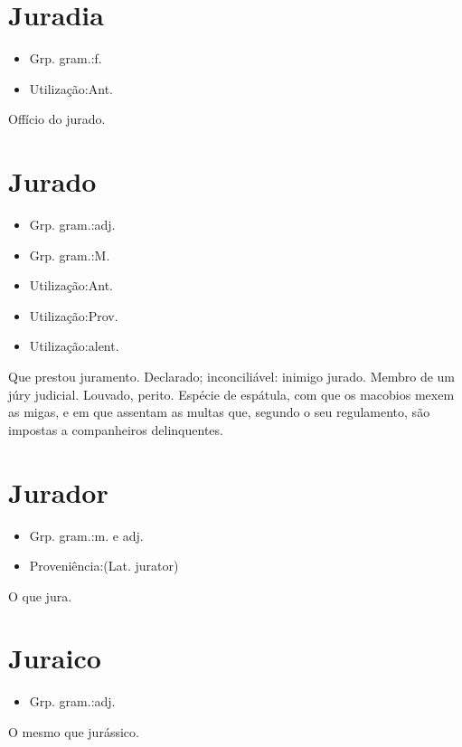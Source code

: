 \documentclass{article}
\begin{document}
\section{Juradia}
\begin{itemize}
\item {Grp. gram.:f.}
\end{itemize}
\begin{itemize}
\item {Utilização:Ant.}
\end{itemize}
Offício do jurado.
\section{Jurado}
\begin{itemize}
\item {Grp. gram.:adj.}
\end{itemize}
\begin{itemize}
\item {Grp. gram.:M.}
\end{itemize}
\begin{itemize}
\item {Utilização:Ant.}
\end{itemize}
\begin{itemize}
\item {Utilização:Prov.}
\end{itemize}
\begin{itemize}
\item {Utilização:alent.}
\end{itemize}
Que prestou juramento.
Declarado; inconciliável: \textunderscore inimigo jurado\textunderscore .
Membro de um júry judicial.
Louvado, perito.
Espécie de espátula, com que os macobios mexem as migas, e em que assentam as multas que, segundo o seu regulamento, são impostas a companheiros delinquentes.
\section{Jurador}
\begin{itemize}
\item {Grp. gram.:m.  e  adj.}
\end{itemize}
\begin{itemize}
\item {Proveniência:(Lat. \textunderscore jurator\textunderscore )}
\end{itemize}
O que jura.
\section{Juraico}
\begin{itemize}
\item {Grp. gram.:adj.}
\end{itemize}
O mesmo que \textunderscore jurássico\textunderscore .
\end{document}
